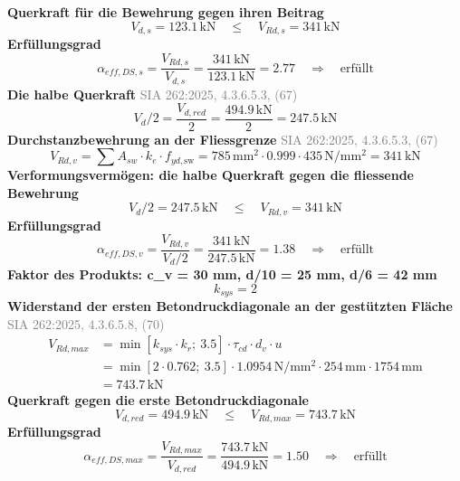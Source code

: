 \documentclass[11pt,a4paper]{article}
\newcommand{\normref}[1]{{\small\textcolor{gray}{#1}}}
\begin{document}
\noindent\textbf{Querkraft für die Bewehrung gegen ihren Beitrag}
\begin{equation*}
V_{d,s} = 123.1\,\mathrm{kN} \quad \le \quad V_{Rd,s} = 341\,\mathrm{kN}
\end{equation*}
\noindent\textbf{Erfüllungsgrad}
\begin{equation*}
\alpha_{eff,DS,s} = \frac{V_{Rd,s}}{V_{d,s}} = \frac{341\,\mathrm{kN}}{123.1\,\mathrm{kN}} = 2.77 \quad \Rightarrow \quad \text{erfüllt}
\end{equation*}
\noindent\textbf{Die halbe Querkraft} \hfill \normref{SIA 262:2025, 4.3.6.5.3, (67)}
\begin{equation*}
V_d / 2 = \frac{V_{d,red}}{2} = \frac{494.9\,\mathrm{kN}}{2} = 247.5\,\mathrm{kN}
\end{equation*}
\noindent\textbf{Durchstanzbewehrung an der Fliessgrenze} \hfill \normref{SIA 262:2025, 4.3.6.5.3, (67)}
\begin{equation*}
V_{Rd,v} = \sum A_{sw} \cdot k_e \cdot f_{yd,\text{sw}} = 785\,\mathrm{mm}^{2} \cdot 0.999 \cdot 435\,\mathrm{N}/\mathrm{mm}^{2} = 341\,\mathrm{kN}
\end{equation*}
\noindent\textbf{Verformungsvermögen: die halbe Querkraft gegen die fliessende Bewehrung}
\begin{equation*}
V_d / 2 = 247.5\,\mathrm{kN} \quad \le \quad V_{Rd,v} = 341\,\mathrm{kN}
\end{equation*}
\noindent\textbf{Erfüllungsgrad}
\begin{equation*}
\alpha_{eff,DS,v} = \frac{V_{Rd,v}}{V_d / 2} = \frac{341\,\mathrm{kN}}{247.5\,\mathrm{kN}} = 1.38 \quad \Rightarrow \quad \text{erfüllt}
\end{equation*}
\noindent\textbf{Faktor des Produkts: c\_v = 30 mm, d/10 = 25 mm, d/6 = 42 mm}
\begin{equation*}
k_{sys} = 2
\end{equation*}
\noindent\textbf{Widerstand der ersten Betondruckdiagonale an der gestützten Fläche} \hfill \normref{SIA 262:2025, 4.3.6.5.8, (70)}
\begin{equation*}
\begin{aligned}
  V_{Rd,max} &= \min\left[k_{sys} \cdot k_r;\ 3.5\right] \cdot \tau_{cd} \cdot d_v \cdot u \\
  &= \min\left[2 \cdot 0.762;\ 3.5\right] \cdot 1.0954\,\mathrm{N}/\mathrm{mm}^{2} \cdot 254\,\mathrm{mm} \cdot 1754\,\mathrm{mm} \\
  &= 743.7\,\mathrm{kN}
\end{aligned}
\end{equation*}
\noindent\textbf{Querkraft gegen die erste Betondruckdiagonale}
\begin{equation*}
V_{d,red} = 494.9\,\mathrm{kN} \quad \le \quad V_{Rd,max} = 743.7\,\mathrm{kN}
\end{equation*}
\noindent\textbf{Erfüllungsgrad}
\begin{equation*}
\alpha_{eff,DS,max} = \frac{V_{Rd,max}}{V_{d,red}} = \frac{743.7\,\mathrm{kN}}{494.9\,\mathrm{kN}} = 1.50 \quad \Rightarrow \quad \text{erfüllt}
\end{equation*}
\end{document}
